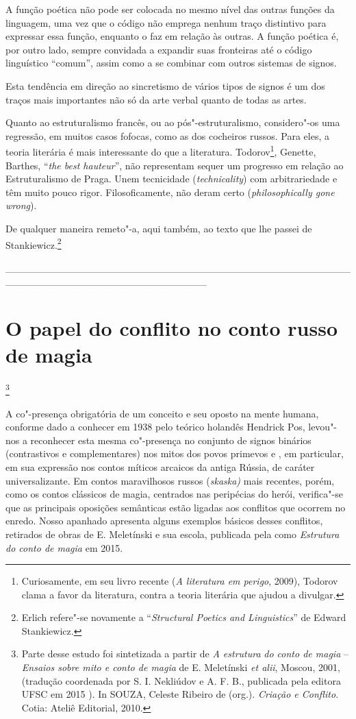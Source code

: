 A função poética não pode ser colocada no mesmo nível das outras funções
da linguagem, uma vez que o código não emprega nenhum traço distintivo
para expressar essa função, enquanto o faz em relação às outras. A
função poética é, por outro lado, sempre convidada a expandir suas
fronteiras até o código linguístico ``comum'', assim como a se combinar
com outros sistemas de signos.

Esta tendência em direção ao sincretismo de vários tipos de signos é um
dos traços mais importantes não só da arte verbal quanto de todas as
artes.

Quanto ao estruturalismo francês, ou ao pós"-estruturalismo, considero"-os
uma regressão, em muitos casos fofocas, como as dos cocheiros russos.
Para eles, a teoria literária é mais interessante do que a literatura.
Todorov\footnote{Curiosamente, em seu livro recente (\emph{A literatura
  em perigo}, 2009), Todorov clama a favor da literatura, contra a
  teoria literária que ajudou a divulgar.}, Genette, Barthes, ``\emph{the best hauteur}'', não representam
sequer um progresso em relação ao Estruturalismo de Praga. Unem
tecnicidade (\emph{technicality}) com arbitrariedade e têm muito pouco
rigor. Filosoficamente, não deram certo (\emph{philosophically gone
wrong}).

De qualquer maneira remeto"-a, aqui também, ao texto que lhe passei de
Stankiewicz.\footnote{Erlich refere"-se novamente a ``\emph{Structural
  Poetics and Linguistics}'' de Edward Stankiewicz.}



\_\_\_\_\_\_\_\_\_\_\_\_\_\_\_\_\_\_\_\_\_\_\_\_\_\_\_\_\_\_\_\_\_\_\_\_\_\_\_\_\_\_\_\_\_\_\_\_\_\_\_\_\_\_\_\_\_\_\_\_\_\_\_\_\_\_\_\_\_\_\_\_\_\_\_\_

\chapter{O papel do conflito no conto russo de magia}\footnote{Parte
  desse estudo foi sintetizada a partir de \emph{A estrutura}  \emph{do
  conto de magia} -- \emph{Ensaios sobre mito e conto de magia} de E.
  Meletínski \emph{et alii}, Moscou, 2001, (tradução coordenada por S.
  I. Nekliúdov e A. F. B., publicada pela editora UFSC em 2015 ). In
  SOUZA, Celeste Ribeiro de (org.). \emph{Criação e Conflito}. Cotia:
  Ateliê Editorial, 2010.}


A co"-presença obrigatória de um conceito e seu oposto na mente humana,
conforme dado a conhecer em 1938 pelo teórico holandês Hendrick Pos,
levou"-nos a reconhecer esta mesma co"-presença no conjunto de signos
binários (contrastivos e complementares) nos mitos dos povos primevos e
, em particular, em sua expressão nos contos míticos arcaicos da antiga
Rússia, de caráter universalizante. Em contos maravilhosos russos
(\emph{skaska)} mais recentes, porém, como os contos clássicos de
magia, centrados nas peripécias do herói, verifica"-se que as principais
oposições semânticas estão ligadas aos conflitos que ocorrem no enredo.
Nosso apanhado apresenta alguns exemplos básicos desses conflitos,
retirados de obras de E. Meletínski e sua escola, publicada pela 
como \emph{Estrutura do conto de magia} em 2015.

